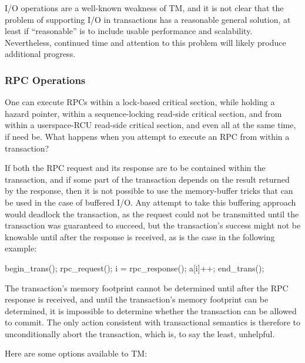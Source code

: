 I/O operations are a well-known weakness of TM, and it is not clear
that the problem of supporting I/O in transactions has a reasonable
general solution, at least if ``reasonable'' is to include usable
performance and scalability.
Nevertheless, continued time and attention to this problem will likely
produce additional progress.

\subsubsection{RPC Operations}
\label{sec:future:RPC Operations}

One can execute RPCs within a lock-based critical section, while holding
a hazard pointer, within a sequence-locking read-side critical section,
and from within a userspace-RCU read-side critical section, and even
all at the same time, if need be.
What happens when you attempt to execute an RPC from within a transaction?

If both the RPC request and its response are to be contained within the
transaction, and if some part of the transaction depends on the result
returned by the response, then it is not possible to use the memory-buffer
tricks that can be used in the case of buffered I/O\@.
Any attempt to
take this buffering approach would deadlock the transaction, as the
request could not be transmitted until the transaction was guaranteed
to succeed, but the transaction's success might not be knowable until
after the response is received, as is the case in the following example:

\begin{VerbatimN}[samepage=true]
begin_trans();
rpc_request();
i = rpc_response();
a[i]++;
end_trans();
\end{VerbatimN}

The transaction's memory footprint cannot be determined until after the
RPC response is received, and until the transaction's memory footprint
can be determined, it is impossible to determine whether the transaction
can be allowed to commit.
The only action consistent with transactional semantics is therefore to
unconditionally abort the transaction, which is, to say the least,
unhelpful.

Here are some options available to TM:

